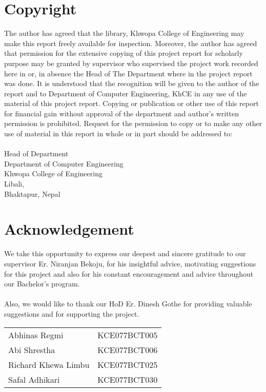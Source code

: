 \large
	\chapter*{Copyright}
\normalsize
{}
	The author has agreed that the library, Khwopa College of Engineering  may make this report freely available for inspection. Moreover, the author has agreed that permission for the extensive copying of this project report for scholarly purpose may be granted by supervisor who supervised the project work recorded here in or, in absence the Head of The Department where in the project report was done. It is understood that the recognition will be given to the author of the report and to Department of Computer Engineering, KhCE in any use of the material of this project report. Copying or publication or other use of this report for financial gain without approval of the department and author’s written permission is prohibited. Request for the permission to copy or to make any other use of material in this report in whole or in part should be addressed to: \\
	\vspace{1cm} \\
	Head of Department \\
	Department of Computer Engineering\\
	Khwopa College of Engineering\\
	Libali,\\
	Bhaktapur, Nepal\\
\pagebreak


\large
\chapter*{Acknowledgement}
\normalsize
{}
We take this opportunity to express our deepest and sincere gratitude to our supervisor Er. Niranjan Bekoju, for his insightful advice, motivating suggestions for this project and also for his constant encouragement and advice throughout our Bachelor’s program.\\\\
Also, we would like to thank our HoD Er. Dinesh Gothe for providing valuable suggestions and for supporting the project.
\begin{table}[h]
	\begin{tabular}{@{}ll}
		      Abhinas Regmi & KCE077BCT005\\
			Abi Shrestha & KCE077BCT006\\
			Richard Khewa Limbu & KCE077BCT025\\
			Safal Adhikari & KCE077BCT030\\
	\end{tabular}
\end{table}
\pagebreak

